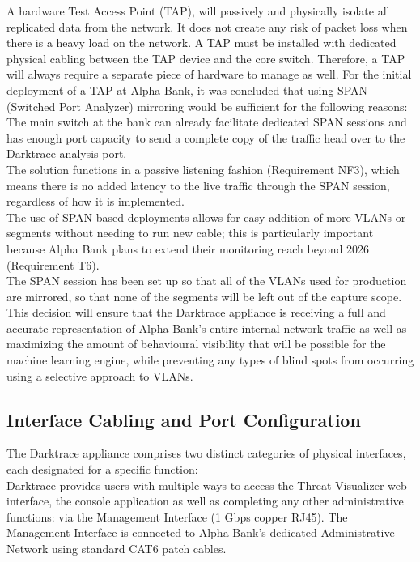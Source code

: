 \documentclass[12pt,a4paper]{report}
\begin{document}
A hardware Test Access Point (TAP), will passively and physically isolate all replicated data from the network. It does not create any risk of packet loss when there is a heavy load on the network. A TAP must be installed with dedicated physical cabling between the TAP device and the core switch. Therefore, a TAP will always require a separate piece of hardware to manage as well. For the initial deployment of a TAP at Alpha Bank, it was concluded that using SPAN (Switched Port Analyzer) mirroring would be sufficient for the following reasons:\\

The main switch at the bank can already facilitate dedicated SPAN sessions and has enough port capacity to send a complete copy of the traffic head over to the Darktrace analysis port.\\

The solution functions in a passive listening fashion (Requirement NF3), which means there is no added latency to the live traffic through the SPAN session, regardless of how it is implemented.\\

The use of SPAN-based deployments allows for easy addition of more VLANs or segments without needing to run new cable; this is particularly important because Alpha Bank plans to extend their monitoring reach beyond 2026 (Requirement T6).\\

The SPAN session has been set up so that all of the VLANs used for production are mirrored, so that none of the segments will be left out of the capture scope. This decision will ensure that the Darktrace appliance is receiving a full and accurate representation of Alpha Bank's entire internal network traffic as well as maximizing the amount of behavioural visibility that will be possible for the machine learning engine, while preventing any types of blind spots from occurring using a selective approach to VLANs.

\subsection{Interface Cabling and Port Configuration}

The Darktrace appliance comprises two distinct categories of physical interfaces, each designated for a specific function:\\

Darktrace provides users with multiple ways to access the Threat Visualizer web interface, the console application as well as completing any other administrative functions: via the Management Interface (1 Gbps copper RJ45). The Management Interface is connected to Alpha Bank's dedicated Administrative Network using standard CAT6 patch cables.\\
\end{document}
